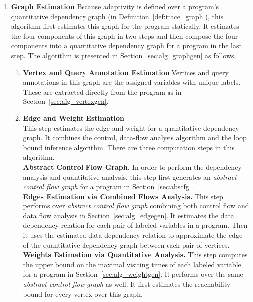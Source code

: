 \begin{enumerate}
  \item \textbf{Graph Estimation}
  Because adaptivity is defined over a program's quantitative dependency graph (in Definition~\ref{def:trace_graph}), this algorithm first estimates this graph for the program statically.
  It estimates the four components of this graph in two steps and then compose the four components into a quantitative dependency graph for a program in the last step.
  The algorithm is presented in Section~\ref{sec:alg_graphgen} as follows.
\begin{enumerate}
  \item \textbf{Vertex and Query Annotation Estimation}
  Vertices and query annotations in this graph are the assigned variables with unique labels. These are extracted directly from the program as in Section~\ref{sec:alg_vertexgen}.
  \item \textbf{Edge and Weight Estimation}
  \\
  This step estimates the edge and weight for a quantitative dependency graph. It combines the control, data-flow  analysis algorithm and the loop bound inference algorithm.
  There are three computation steps in this algorithm.
  \\
  \textbf{Abstract Control Flow Graph.}
  In order to perform the dependency analysis and quantitative analysis, this step first generates an \emph{abstract control flow graph} for a program in Section~\ref{sec:abscfg}.
  \\
  \textbf{Edges Estimation via Combined Flows Analysis.} 
  This step performs over \emph{abstract control flow graph} combining both control flow and data flow analysis in
  Section~\ref{sec:alg_edgegen}.
  It estimates the data dependency relation for each pair of labeled variables in a program. Then it uses the estimated data dependency relation to approximate the edge of the quantitative dependency graph between each pair of vertices.
  \\
  \textbf{Weights Estimation via Quantitative Analysis.} 
  This step computes the upper bound on the maximal visiting times of each labeled variable for a program in Section~\ref{sec:alg_weightgen}.
  It performs over the same \emph{abstract control flow graph} as well. It first estimates the reachability bound for every vertex over this graph.

\end{enumerate}
\end{enumerate}
